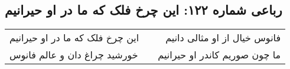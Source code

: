 \begin{center}
\section*{رباعی شماره ۱۲۲: این چرخ فلک که ما در او حیرانیم}
\label{sec:sh122}
\begin{longtable}{l p{0.5cm} r}
این چرخ فلک که ما در او حیرانیم
&&
فانوس خیال از او مثالی دانیم
\\
خورشید چراغ دان و عالم فانوس
&&
ما چون صوریم کاندر او حیرانیم
\\
\end{longtable}
\end{center}
